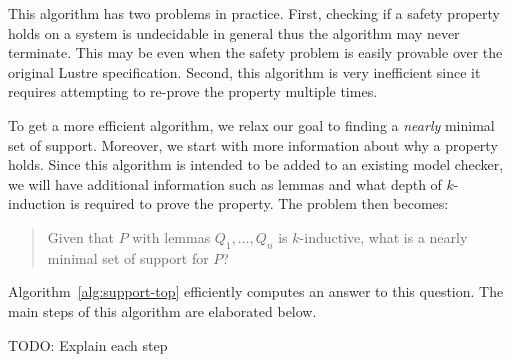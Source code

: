 This algorithm has two problems in practice. First, checking if a
safety property holds on a system is undecidable in general thus the
algorithm may never terminate. This may be even when the safety
problem is easily provable over the original Lustre specification.
Second, this algorithm is very inefficient since it requires
attempting to re-prove the property multiple times.


To get a more efficient algorithm, we relax our goal to finding a {\em
  nearly} minimal set of support. Moreover, we start with more
information about why a property holds. Since this algorithm is
intended to be added to an existing model checker, we will have
additional information such as lemmas and what depth of $k$-induction
is required to prove the property. The problem then becomes:
\begin{quote}
Given that $P$ with lemmas $Q_1, \ldots, Q_n$ is $k$-inductive, what
is a nearly minimal set of support for $P$?
\end{quote}
Algorithm~\ref{alg:support-top} efficiently computes an answer to this
question. The main steps of this algorithm are elaborated below.

TODO: Explain each step



